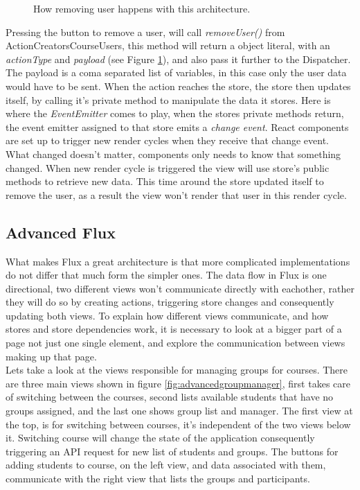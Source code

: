 \begin{figure}[h]
  \scalebox{0.8}{}
  \caption{How removing user happens with this architecture.}
  \label{fig:simplefluxremoveuser}
\end{figure}

Pressing the button to remove a user, will call \emph{removeUser()} from ActionCreatorsCourseUsers, this method will return a object literal, with an \emph{actionType} and \emph{payload} (see Figure \ref{fig:simplefluxremoveuser}), and also pass it further to the Dispatcher. The payload is a coma separated list of variables, in this case only the user data would have to be sent. When the action reaches the store, the store then updates itself, by calling it's private method to manipulate the data it stores. Here is where the \emph{EventEmitter} comes to play, when the stores private methods return, the event emitter assigned to that store emits a \emph{change event}. React components are set up to trigger new render cycles when they receive that change event. What changed doesn't matter, components only needs to know that something changed. When new render cycle is triggered the view will use store's public methods to retrieve new data. This time around the store updated itself to remove the user, as a result the view won't render that user in this render cycle.

\subsection{Advanced Flux}\label{sec:advancedfluxexample}
What makes Flux a great architecture is that more complicated implementations do not differ that much form the simpler ones. The data flow in Flux is one directional, two different views won't communicate directly with eachother, rather they will do so by creating actions, triggering store changes and consequently updating both views. To explain how different views communicate, and how stores and store dependencies work, it is necessary to look at a bigger part of a page not just one single element, and explore the communication between views making up that page.
\\Lets take a look at the views responsible for managing groups for courses. There are three main views shown in figure \ref{fig:advancedgroupmanager}, first takes care of switching between the courses, second lists available students that have no groups assigned, and the last one shows group list and manager. The first view at the top, is for switching between courses, it's independent of the two views below it. Switching course will change the state of the application consequently triggering an API request for new list of students and groups. The buttons for adding students to course, on the left view, and data associated with them, communicate with the right view that lists the groups and participants.

